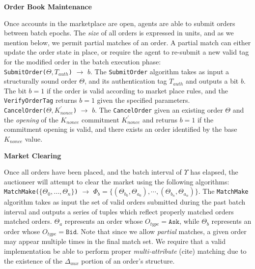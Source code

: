 \documentclass[10pt,a4paper]{article}
\theoremstyle{definition}
\begin{document}
\begin{center}
    \textbf{Order Book Maintenance}
\end{center}

Once accounts in the marketplace are open, agents are able to submit orders
between batch epochs. The \emph{size} of all orders is expressed in units, and
as we mention below, we permit partial matches of an order. A partial match can
either update the order state in place, or require the agent to re-submit a new
valid tag for the modified order in the batch execution phase: \\

\texttt{SubmitOrder($\Theta, T_{auth}$)} $\rightarrow$ $b$. The
\texttt{SubmitOrder} algorithm takes as input a structurally sound order
$\Theta$, and its authentication tag $T_{auth}$ and outputs a bit $b$. The bit
$b=1$ if the order is valid according to market place rules, and the
\texttt{VerifyOrderTag} returns $b=1$ given the specified parameters. \\

\texttt{CancelOrder($\Theta, K_{nonce}^\prime$)} $\rightarrow$ $b$. The
\texttt{CancelOrder} given an existing order $\Theta$ and the \emph{opening} of
the $K_{nonce}$ commitment $K_{nonce}^\prime$ and returns $b=1$ if the
commitment opening is valid, and there exists an order identified by the base
$K_{nonce}$ value.

\begin{center}
    \textbf{Market Clearing}
\end{center}

Once all orders have been placed, and the batch interval of $\Upsilon$ has
elapsed, the auctioneer will attempt to clear the market using the following
algorithms: \\

\texttt{MatchMake($\{\Theta_0, \ldots, \Theta_n\}$)} $\rightarrow$
$\Phi_b = \{(\Theta_{b_0}, \Theta_{a_0}), \cdots, (\Theta_{b_n}, \Theta_{a_n})\}$. The
\texttt{MatchMake} algorithm takes as input the set of valid orders submitted
during the past batch interval and outputs a series of tuples which reflect
properly matched orders matched orders. $\Theta_a$ represents an order whose
$O_{type} = \texttt{Ask}$, while $\Theta_b$ represents an order whose $O_{type}
= \texttt{Bid}$. Note that since we allow \emph{partial} matches, a given order
may appear multiple times in the final match set. We require that a valid
implementation be able to perform proper \emph{multi-attribute} (cite) matching
due to the existence of the $\Delta_{aux}$ portion of an order's structure. \\
\end{document}
